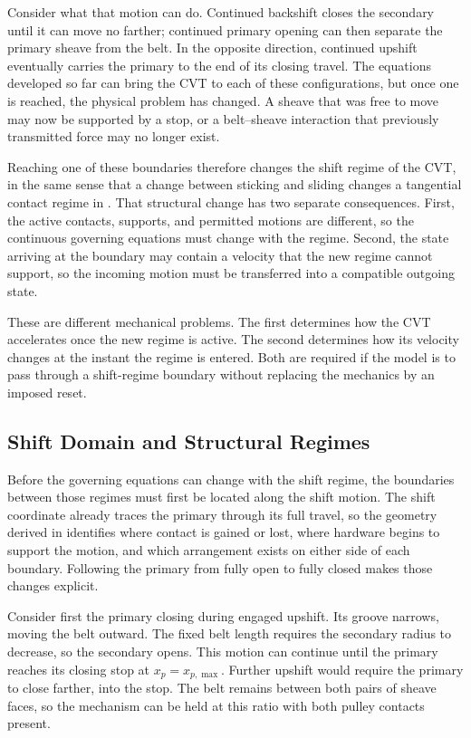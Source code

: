 \documentclass[11pt]{report}
\numberwithin{equation}{section}
\begin{document}
Consider what that motion can do.
Continued backshift closes the secondary until it can move no farther;
continued primary opening can then separate the primary sheave from the belt.
In the opposite direction, continued upshift eventually carries the primary
to the end of its closing travel.
The equations developed so far can bring the CVT to each of these configurations,
but once one is reached, the physical problem has changed.
A sheave that was free to move may now be supported by a stop,
or a belt--sheave interaction that previously transmitted force may no longer exist.

Reaching one of these boundaries therefore changes the shift regime of the CVT,
in the same sense that a change between sticking and sliding changes a tangential contact regime
in .
That structural change has two separate consequences.
First, the active contacts, supports, and permitted motions are different,
so the continuous governing equations must change with the regime.
Second, the state arriving at the boundary may contain a velocity that the new regime
cannot support, so the incoming motion must be transferred into a compatible outgoing state.

These are different mechanical problems.
The first determines how the CVT accelerates once the new regime is active.
The second determines how its velocity changes at the instant the regime is entered.
Both are required if the model is to pass through a shift-regime boundary
without replacing the mechanics by an imposed reset.

\subsection{Shift Domain and Structural Regimes}
\label{sec:shift_coordinate_boundaries}

Before the governing equations can change with the shift regime,
the boundaries between those regimes must first be located along the shift motion.
The shift coordinate already traces the primary through its full travel, so the
geometry derived in  identifies where contact is gained or
lost, where hardware begins to support the motion, and which arrangement exists
on either side of each boundary. Following the primary from fully open to fully
closed makes those changes explicit.

Consider first the primary closing during engaged upshift. Its groove
narrows, moving the belt outward. The fixed belt length requires the secondary
radius to decrease, so the secondary opens. This motion can continue until
the primary reaches its closing stop at \(x_p=x_{p,\max}\). Further upshift
would require the primary to close farther, into the stop. The belt remains
between both pairs of sheave faces, so the mechanism can be held at this
ratio with both pulley contacts present.
\end{document}
